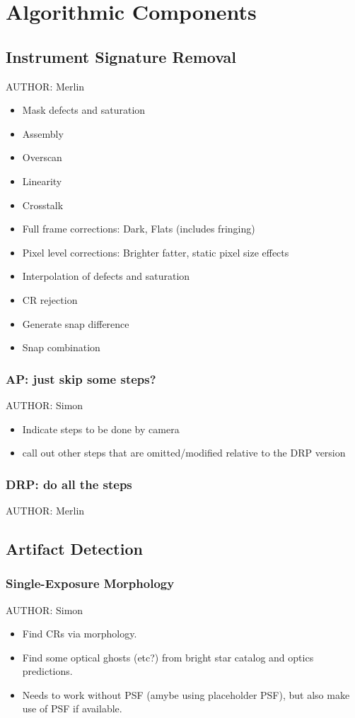\section{Algorithmic Components}
\label{sec:algorithmic-components}

\subsection{Instrument Signature Removal}
\label{sec:acISR}
AUTHOR: Merlin
\begin{itemize}
\item Mask defects and saturation
\item Assembly
\item Overscan
\item Linearity
\item Crosstalk
\item Full frame corrections: Dark, Flats (includes fringing)
\item Pixel level corrections: Brighter fatter, static pixel size effects
\item Interpolation of defects and saturation
\item CR rejection
\item Generate snap difference
\item Snap combination
\end{itemize}

\subsubsection{AP: just skip some steps?}
AUTHOR: Simon
\begin{itemize}
\item Indicate steps to be done by camera
\item call out other steps that are omitted/modified relative to the DRP version
\end{itemize}

\subsubsection{DRP: do all the steps}
AUTHOR: Merlin


\subsection{Artifact Detection}
\label{sec:artifact}

\subsubsection{Single-Exposure Morphology}
\label{sec:acMorphologicalArtifactDetection}
AUTHOR: Simon
\begin{itemize}
\item Find CRs via morphology.
\item Find some optical ghosts (etc?) from bright star catalog and optics predictions.
\item Needs to work without PSF (amybe using placeholder PSF), but also make use of PSF if available.
\end{itemize}

